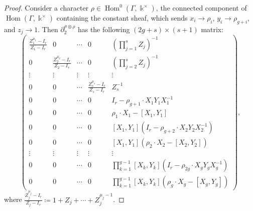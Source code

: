 \documentclass[11pt]{amsart}
\theoremstyle{definition}
\renewcommand{\k}{\Bbbk}
\DeclareMathOperator{\Hom}{{Hom}}
\begin{document}
\begin{proof}
Consider a character $\rho\in \Hom^0(\Gamma, \k^{\times})$, 
the connected component of $\Hom(\Gamma,\k^{\times})$ 
containing the constant sheaf, which sends $x_i\to \rho_i$, 
$y_i\to \rho_{g+i}$, and $z_j\to 1$. 
Then $\partial_2^{\sigma \otimes \rho} $ has the following 
$(2g+s)\times (s+1)$ matrix:
\[ 
\begin{pmatrix} 
\label{matrix compact bis} 
\frac{ Z_{1}^{\mu_{1}}-I_r}{ Z_{1}-I_r} & 0 & \cdots & 0 & (\prod_{j=1}^s  Z_j)^{-1} \\
0 & \frac{ Z_{2}^{\mu_{2}}-I_r}{ Z_{2}-I_r} & \cdots & 0 & (\prod_{j=2}^s  Z_j)^{-1} \\
\vdots & \vdots & \vdots & \vdots & \vdots \\
0 & 0 & \cdots & \frac{Z_{s}^{\mu_{s}}-I_r}{ Z_{s}-I_r} & Z_s^{-1} \\
0& 0 & \cdots & 0 & I_r-\rho_{g+1}\cdot X_1Y_1X_1^{-1} \\
0& 0 & \cdots & 0 & \rho_1\cdot X_1-[X_{1},Y_{1}] \\
0& 0 & \cdots & 0 & [X_1,Y_1] (I_r-\rho_{g+2}\cdot X_2Y_2X_2^{-1}) \\
0& 0 & \cdots & 0 & [X_1,Y_1] (\rho_2\cdot X_2-[X_{2},Y_{2}]) \\
\vdots& \vdots & \vdots & \vdots & \vdots \\
0& 0 & \cdots & 0 & \prod_{k=1}^{g-1}[X_k,Y_k] (I_r-\rho_{2g}\cdot X_g Y_g X_g^{-1}) \\
0& 0 & \cdots & 0 & \prod_{k=1}^{g-1}[X_k,Y_k] (\rho_g\cdot X_g-[X_{g},Y_{g}])
\end{pmatrix},
\]
where $\frac{Z_{j}^{\mu_{j}}-I_r}{Z_{j}-I_r}\coloneqq 1+Z_j+\cdots+Z_j^{\mu_j-1}$.


\end{proof}
\end{document}
